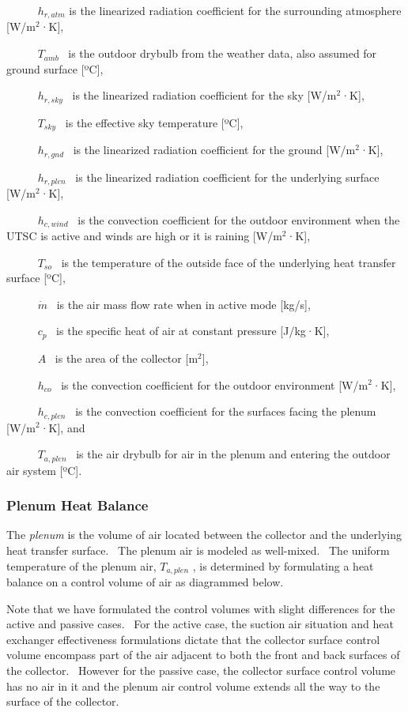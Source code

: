 ~~~~~ \({h_{r,atm}}\) is the linearized radiation coefficient for the surrounding atmosphere {[}W/m\(^{2}\)·K{]},

~~~~~ \({T_{amb}}\) ~is the outdoor drybulb from the weather data, also assumed for ground surface {[}ºC{]},

~~~~~ \({h_{r,sky}}\) ~is the linearized radiation coefficient for the sky {[}W/m\(^{2}\)·K{]},

~~~~~ \({T_{sky}}\) ~is the effective sky temperature {[}ºC{]},

~~~~~ \({h_{r,gnd}}\) ~is the linearized radiation coefficient for the ground {[}W/m\(^{2}\)·K{]},

~~~~~ \({h_{r,plen}}\) ~is the linearized radiation coefficient for the underlying surface {[}W/m\(^{2}\)·K{]},

~~~~~ \({h_{c,wind}}\) ~is the convection coefficient for the outdoor environment when the UTSC is active and winds are high or it is raining {[}W/m\(^{2}\)·K{]},

~~~~~ \({T_{so}}\) ~is the temperature of the outside face of the underlying heat transfer surface {[}ºC{]},

~~~~~ \(\dot m\) ~is the air mass flow rate when in active mode {[}kg/s{]},

~~~~~ \({c_p}\) ~is the specific heat of air at constant pressure {[}J/kg·K{]},

~~~~~ \(A\) ~is the area of the collector {[}m\(^{2}\){]},

~~~~~ \({h_{co}}\) ~is the convection coefficient for the outdoor environment {[}W/m\(^{2}\)·K{]},

~~~~~ \({h_{c,plen}}\) ~is the convection coefficient for the surfaces facing the plenum {[}W/m\(^{2}\)·K{]}, and

~~~~~ \({T_{a,plen}}\) ~is the air drybulb for air in the plenum and entering the outdoor air system {[}ºC{]}.

\subsubsection{Plenum Heat Balance}\label{plenum-heat-balance}

The \emph{plenum} is the volume of air located between the collector and the underlying heat transfer surface.~ The plenum air is modeled as well-mixed.~ The uniform temperature of the plenum air, \({T_{a,plen}}\) , is determined by formulating a heat balance on a control volume of air as diagrammed below.

Note that we have formulated the control volumes with slight differences for the active and passive cases.~ For the active case, the suction air situation and heat exchanger effectiveness formulations dictate that the collector surface control volume encompass part of the air adjacent to both the front and back surfaces of the collector.~ However for the passive case, the collector surface control volume has no air in it and the plenum air control volume extends all the way to the surface of the collector.

